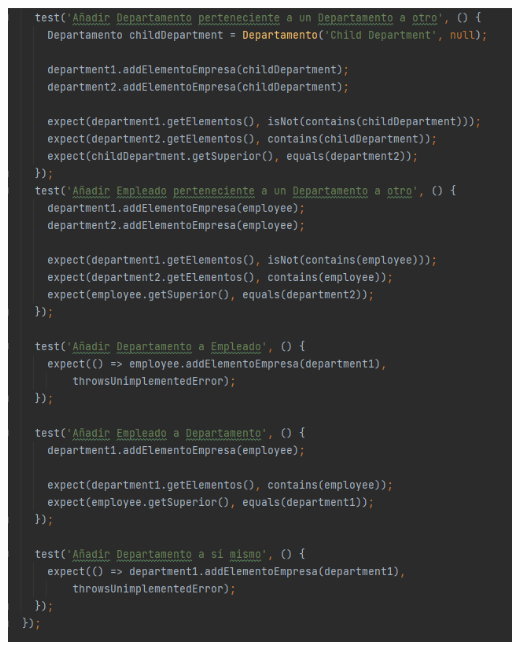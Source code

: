 \documentclass[openany]{article}
\begin{document}
\includegraphics[width=6.26772in,height=7.875in]{imagenes/testGrupo1part2.png}
\end{document}
